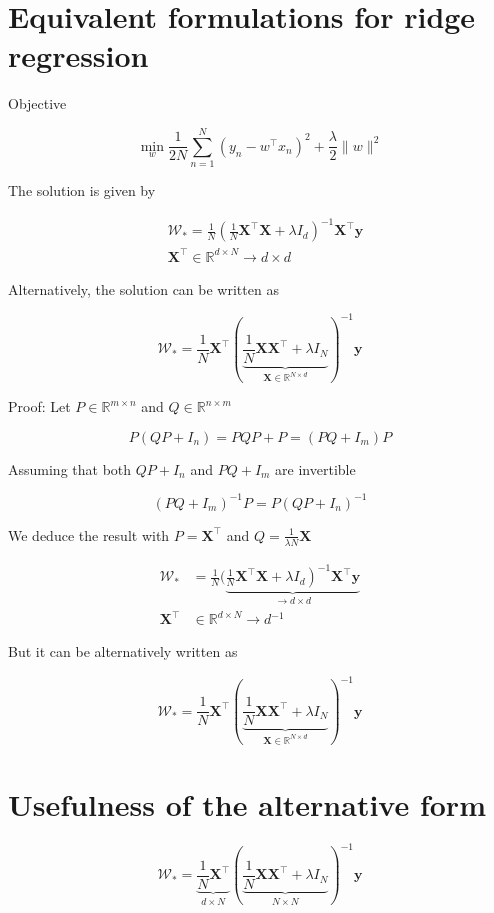 \section*{Equivalent formulations for ridge regression}
Objective

$$
\min _{w} \frac{1}{2 N} \sum_{n=1}^{N}\left(y_{n}-w^{\top} x_{n}\right)^{2}+\frac{\lambda}{2}\|w\|^{2}
$$

The solution is given by

$$
\begin{aligned}
& \mathcal{W}_{*}=\frac{1}{N}\left(\frac{1}{N} \mathbf{X}^{\top} \mathbf{X}+\lambda I_{d}\right)^{-1} \mathbf{X}^{\top} \mathbf{y} \\
& \mathbf{X}^{\top} \in \mathbb{R}^{d \times N} \rightarrow d \times d
\end{aligned}
$$

Alternatively, the solution can be written as

$$
\mathcal{W}_{*}=\frac{1}{N} \mathbf{X}^{\top}(\underbrace{\frac{1}{N} \mathbf{X X}^{\top}+\lambda I_{N}}_{\mathbf{X} \in \mathbb{R}^{N \times d}})^{-1} \mathbf{y}
$$

Proof: Let $P \in \mathbb{R}^{m \times n}$ and $Q \in \mathbb{R}^{n \times m}$

$$
P\left(Q P+I_{n}\right)=P Q P+P=\left(P Q+I_{m}\right) P
$$

Assuming that both $Q P+I_{n}$ and $P Q+I_{m}$ are invertible

$$
\left(P Q+I_{m}\right)^{-1} P=P\left(Q P+I_{n}\right)^{-1}
$$

We deduce the result with $P=\mathbf{X}^{\top}$ and $Q=\frac{1}{\lambda N} \mathbf{X}$

$$
\begin{aligned}
\mathcal{W}_{*} & =\frac{1}{N}(\underbrace{\left.\frac{1}{N} \mathbf{X}^{\top} \mathbf{X}+\lambda I_{d}\right)^{-1} \mathbf{X}^{\top} \mathbf{y}}_{\rightarrow d \times d} \\
\mathbf{X}^{\top} & \in \mathbb{R}^{d \times N} \rightarrow d{ }^{-1}
\end{aligned}
$$

But it can be alternatively written as

$$
\mathcal{W}_{*}=\frac{1}{N} \mathbf{X}^{\top}(\underbrace{\frac{1}{N} \mathbf{X X}^{\top}+\lambda I_{N}}_{\mathbf{X} \in \mathbb{R}^{N \times d}})^{-1} \mathbf{y}
$$

\section*{Usefulness of the alternative form}
$$
\mathcal{W}_{*}=\underbrace{\frac{1}{N} \mathbf{X}^{\top}}_{d \times N}(\underbrace{\frac{1}{N} \mathbf{X X}^{\top}+\lambda I_{N}}_{N \times N})^{-1} \mathbf{y}
$$

